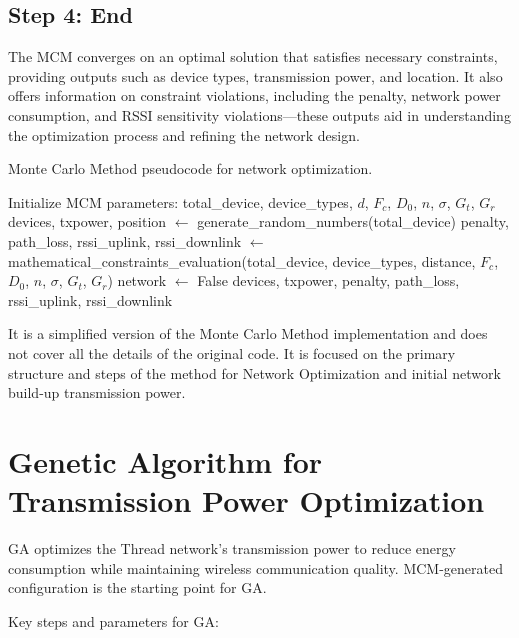 \subsection{Step 4: End}\label{sec:monte_carlo_method_step_4}
The MCM converges on an optimal solution that satisfies necessary constraints, providing outputs such as device types, transmission power, and location. It also offers information on constraint violations, including the penalty, network power consumption, and RSSI sensitivity violations—these outputs aid in understanding the optimization process and refining the network design.

\begin{algorithm}
    \caption{Monte Carlo Method pseudocode for network optimization.}
    \label{alg:mcm}
    \begin{algorithmic}
    \STATE Initialize MCM parameters: total\_device, device\_types, $d$, $F_c$, $D_0$, $n$, $\sigma$, $G_t$, $G_r$
        \STATE devices, txpower, position $\gets$ generate\_random\_numbers(total\_device)
        \STATE penalty, path\_loss, rssi\_uplink, rssi\_downlink $\gets$ mathematical\_constraints\_evaluation(total\_device, device\_types, distance, $F_c$, $D_0$, $n$, $\sigma$, $G_t$, $G_r$)
            \STATE network $\gets$ False
        \ENDIF
        \RETURN devices, txpower, penalty, path\_loss, rssi\_uplink, rssi\_downlink
    \ENDWHILE
    \end{algorithmic}
\end{algorithm}

It is a simplified version of the Monte Carlo Method implementation and does not cover all the details of the original code. It is focused on the primary structure and steps of the method for Network Optimization and initial network build-up transmission power.

\section{Genetic Algorithm for Transmission Power Optimization}\label{sec:genetic_algorithm}
GA optimizes the Thread network's transmission power to reduce energy consumption while maintaining wireless communication quality. MCM-generated configuration is the starting point for GA.

Key steps and parameters for GA:


